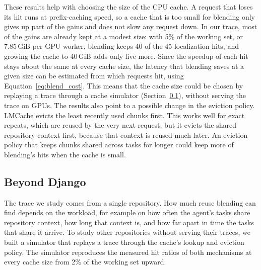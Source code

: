 These results help with choosing the size of the CPU cache. A request that loses its hit runs at prefix-caching speed, so a cache that is too small for blending only gives up part of the gains and does not slow any request down. In our trace, most of the gains are already kept at a modest size: with 5\% of the working set, or 7.85\,GiB per GPU worker, blending keeps 40 of the 45 localization hits, and growing the cache to 40\,GiB adds only five more. Since the speedup of each hit stays about the same at every cache size, the latency that blending saves at a given size can be estimated from which requests hit, using Equation~\ref{eq:blend_cost}. This means that the cache size could be chosen by replaying a trace through a cache simulator (Section~\ref{sec:cb_other_repos}), without serving the trace on GPUs. The results also point to a possible change in the eviction policy. LMCache evicts the least recently used chunks first. This works well for exact repeats, which are reused by the very next request, but it evicts the shared repository context first, because that context is reused much later. An eviction policy that keeps chunks shared across tasks for longer could keep more of blending's hits when the cache is small.

\subsection{Beyond Django}
\label{sec:cb_other_repos}

The trace we study comes from a single repository. How much reuse blending can find depends on the workload, for example on how often the agent's tasks share repository context, how long that context is, and how far apart in time the tasks that share it arrive. To study other repositories without serving their traces, we built a simulator that replays a trace through the cache's lookup and eviction policy. The simulator reproduces the measured hit ratios of both mechanisms at every cache size from 2\% of the working set upward.



